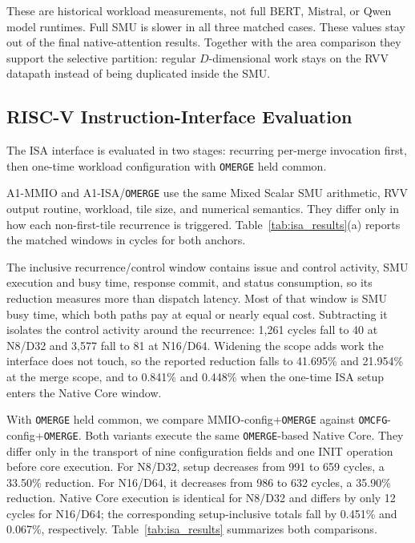 \documentclass[journal]{IEEEtran}
\begin{document}
These are historical workload measurements, not full BERT, Mistral, or Qwen
model runtimes. Full SMU is slower in all three matched cases.
These values stay out of the final native-attention results. Together with the
area comparison they support the selective partition: regular $D$-dimensional
work stays on the RVV datapath instead of being duplicated inside the SMU.

\subsection{RISC-V Instruction-Interface Evaluation}
\label{sec:isa_evaluation}
The ISA interface is evaluated in two stages: recurring per-merge invocation
first, then one-time workload configuration with \texttt{OMERGE} held common.

A1-MMIO and A1-ISA/\texttt{OMERGE} use the same Mixed Scalar SMU arithmetic, RVV output
routine, workload, tile size, and numerical semantics. They differ only in how
each non-first-tile recurrence is triggered. Table~\ref{tab:isa_results}(a)
reports the matched windows in cycles for both anchors.

The inclusive recurrence/control window contains issue and control activity, SMU
execution and busy time, response commit, and status consumption, so its
reduction measures more than dispatch latency. Most of that window is SMU busy
time, which both paths pay at equal or nearly equal cost. Subtracting it isolates the control activity around
the recurrence: 1,261 cycles fall to 40 at N8/D32 and 3,577 fall to 81 at
N16/D64. Widening the scope adds work the interface does not touch, so the
reported reduction falls to 41.695\% and 21.954\%
at the merge scope, and to 0.841\% and 0.448\% when the one-time ISA setup
enters the Native Core window.

With \texttt{OMERGE} held common, we compare MMIO-config+\texttt{OMERGE} against
\texttt{OMCFG}-config+\texttt{OMERGE}. Both variants execute the same \texttt{OMERGE}-based Native Core.
They differ only in the transport of nine configuration fields and one INIT
operation before core execution. For N8/D32, setup decreases from 991 to 659
cycles, a 33.50\% reduction. For N16/D64, it decreases from 986 to 632 cycles,
a 35.90\% reduction. Native Core execution is identical for N8/D32 and differs
by only 12 cycles for N16/D64; the corresponding setup-inclusive totals fall by
0.451\% and 0.067\%, respectively. Table~\ref{tab:isa_results} summarizes
both comparisons.
\end{document}
